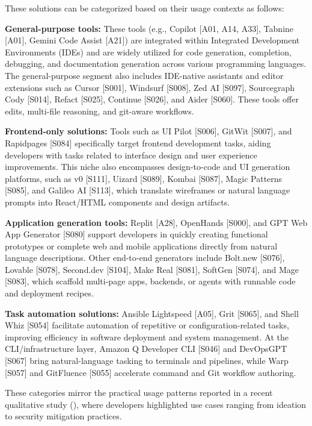 These solutions can be categorized based on their usage contexts as follows:

\textbf{General-purpose tools:} These tools (e.g., Copilot [A01, A14, A33], Tabnine [A01], Gemini Code Assist [A21]) are integrated within Integrated Development Environments (IDEs) and are widely utilized for code generation, completion, debugging, and documentation generation across various programming languages. The general-purpose segment also includes IDE-native assistants and editor extensions such as Cursor [S001], Windsurf [S008], Zed AI [S097], Sourcegraph Cody [S014], Refact [S025], Continue [S026], and Aider [S060]. These tools offer edits, multi-file reasoning, and git-aware workflows.

\textbf{Frontend-only solutions:} Tools such as UI Pilot [S006], GitWit [S007], and Rapidpages [S084] specifically target frontend development tasks, aiding developers with tasks related to interface design and user experience improvements. This niche also encompasses design-to-code and UI generation platforms, such as v0 [S111], Uizard [S089], Kombai [S087], Magic Patterns [S085], and Galileo AI [S113], which translate wireframes or natural language prompts into React/HTML components and design artifacts.

\textbf{Application generation tools:} Replit [A28], OpenHands [S000], and GPT Web App Generator [S080] support developers in quickly creating functional prototypes or complete web and mobile applications directly from natural language descriptions. Other end-to-end generators include Bolt.new [S076], Lovable [S078], Second.dev [S104], Make Real [S081], SoftGen [S074], and Mage [S083], which scaffold multi-page apps, backends, or agents with runnable code and deployment recipes.

\textbf{Task automation solutions:} Ansible Lightspeed [A05], Grit [S065], and Shell Whiz [S054] facilitate automation of repetitive or configuration-related tasks, improving efficiency in software deployment and system management. At the CLI/infrastructure layer, Amazon Q Developer CLI [S046] and DevOpsGPT [S067] bring natural-language tasking to terminals and pipelines, while Warp [S057] and GitFluence [S055] accelerate command and Git workflow authoring.

These categories mirror the practical usage patterns reported in a recent qualitative study (\cite{klemmer2024using}), where developers highlighted use cases ranging from ideation to security mitigation practices.

